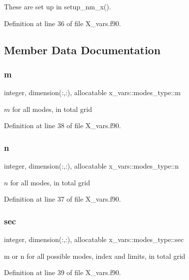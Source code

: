 These are set up in setup\+\_\+nm\+\_\+x(). 

Definition at line 36 of file X\+\_\+vars.\+f90.



\subsection{Member Data Documentation}
\mbox{\label{structx__vars_1_1modes__type_a75bcb0fb494d2e896553502ab67499ff}} 
\subsubsection{\texorpdfstring{m}{m}}
{\footnotesize\ttfamily integer, dimension(\+:,\+:), allocatable x\+\_\+vars\+::modes\+\_\+type\+::m}



$m$ for all modes, in total grid 



Definition at line 38 of file X\+\_\+vars.\+f90.

\mbox{\label{structx__vars_1_1modes__type_ab6d49ba52a26dd5d76685cc605e16ec0}} 
\subsubsection{\texorpdfstring{n}{n}}
{\footnotesize\ttfamily integer, dimension(\+:,\+:), allocatable x\+\_\+vars\+::modes\+\_\+type\+::n}



$n$ for all modes, in total grid 



Definition at line 37 of file X\+\_\+vars.\+f90.

\mbox{\label{structx__vars_1_1modes__type_acf880c5c3f78457cd4d40a3adf410eb7}} 
\subsubsection{\texorpdfstring{sec}{sec}}
{\footnotesize\ttfamily integer, dimension(\+:,\+:), allocatable x\+\_\+vars\+::modes\+\_\+type\+::sec}



{\ttfamily m} or {\ttfamily n} for all possible modes, index and limits, in total grid 



Definition at line 39 of file X\+\_\+vars.\+f90.




